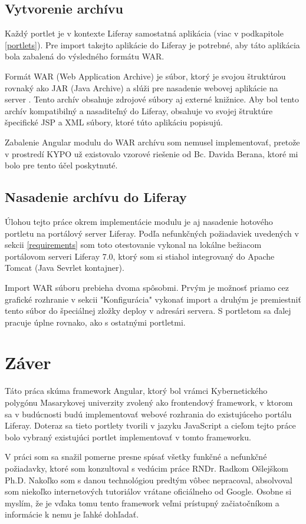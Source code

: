 \documentclass[
  digital, %
  twoside, %
  notable,   %
  nolof,   %
  nolot,   %
]{fithesis3}
\newcommand{\inquotes}[1]{{}"{}#1{}"{}}
\begin{document}
\section{Vytvorenie archívu}
Každý portlet je v kontexte Liferay samostatná aplikácia (viac v podkapitole \ref{portlets}). Pre import takejto aplikácie do Liferay je potrebné, aby táto aplikácia bola zabalená do výsledného formátu WAR.

Formát WAR (Web Application Archive) je súbor, ktorý je svojou štruktúrou rovnaký ako JAR (Java Archive) a slúži pre nasadenie webovej aplikácie na server \cite{javaWorld}. Tento archív obsahuje zdrojové súbory aj externé knižnice. Aby bol tento archív kompatibilný a nasaditeľný do Liferay, obsahuje vo svojej štruktúre špecifické JSP a XML súbory, ktoré túto aplikáciu popisujú.

Zabalenie Angular modulu do WAR archívu som nemusel implementovať, pretože v prostredí KYPO už existovalo vzorové riešenie od Bc. Davida Berana, ktoré mi bolo pre tento účel poskytnuté.

\section{Nasadenie archívu do Liferay}
Úlohou tejto práce okrem implementácie modulu je aj nasadenie hotového portletu na portálový server Liferay. Podľa nefunkčných požiadaviek uvedených v sekcii \ref{requirements} som toto otestovanie vykonal na lokálne bežiacom portálovom serveri Liferay 7.0, ktorý som si stiahol integrovaný do Apache Tomcat (Java Sevrlet kontajner).

Import WAR súboru prebieha dvoma spôsobmi. Prvým je možnosť priamo cez grafické rozhranie v sekcii \inquotes{Konfigurácia} vykonať import a druhým je premiestniť tento súbor do špeciálnej zložky deploy v adresári servera. S portletom sa ďalej pracuje úplne rovnako, ako s ostatnými portletmi.

\chapter{Záver}
Táto práca skúma framework Angular, ktorý bol vrámci Kybernetického polygónu Masarykovej univerzity zvolený ako frontendový framework, v ktorom sa v budúcnosti budú implementovať webové rozhrania do existujúceho portálu Liferay. Doteraz sa tieto portlety tvorili v jazyku JavaScript a cieľom tejto práce bolo vybraný existujúci portlet implementovať v tomto frameworku.

V práci som sa snažil pomerne presne spísať všetky funkčné a nefunkčné požiadavky, ktoré som konzultoval s vedúcim práce RNDr. Radkom Ošlejškom Ph.D. Nakoľko som s danou technológiou predtým vôbec nepracoval, absolvoval som niekoľko internetových tutoriálov vrátane oficiálneho od Google. Osobne si myslím, že je vďaka tomu tento framework veľmi prístupný začiatočníkom a informácie k nemu je ľahké dohľadať.
\end{document}
